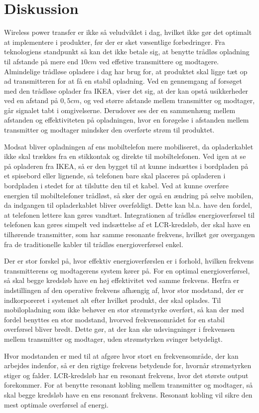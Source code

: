 \chapter{Diskussion}

Wireless power transfer er ikke så veludviklet i dag, hvilket ikke gør det optimalt at implementere i produkter, før der er sket væsentlige forbedringer. Fra teknologiens standpunkt så kan det ikke betale sig, at benytte trådløs opladning til afstande på mere end $10cm$ ved effetive transmittere og modtagere. Almindelige trådløse opladere i dag har brug for, at produktet skal ligge tæt op ad transmitteren for at få en stabil opladning. Ved en gennemgang af forsøget med den trådløse oplader fra IKEA, viser det sig, at der kan opstå usikkerheder ved en afstand på $0,5 cm$, og ved større afstande mellem transmitter og modtager, går signalet tabt i omgivelserne. Derudover ses der en sammenhæng mellem afstanden og effektiviteten på opladningen, hvor en forøgelse i afstanden mellem transmitter og modtager mindsker den overførte strøm til produktet.

Modsat bliver opladningen af ens mobiltelefon mere mobiliseret, da opladerkablet ikke skal trækkes fra en stikkontak og direkte til mobiltelefonen. Ved igen at se på opladeren fra IKEA, så er den bygget til at kunne indsættes i bordpladen på et spisebord eller lignende, så telefonen bare skal placeres på opladeren i bordpladen i stedet for at tilslutte den til et kabel. Ved at kunne overføre energien til mobiltelefoner trådløst, så sker der også en ændring på selve mobilen, da indgangen til opladerkablet bliver overføldigt. Dette kan bl.a. have den fordel, at telefonen lettere kan gøres vandtæt. Integrationen af trådløs energioverførsel til telefonen kan gøres simpelt ved indsættelse af et LCR-kredsløb, der skal have en tilhørende transmitter, som har samme resonante frekvens, hvilket gør overgangen fra de traditionelle kabler til trådløs energioverførsel enkel.

Der er stor forskel på, hvor effektiv energioverførslen er i forhold, hvilken frekvens transmitterens og modtagerens system kører på. For en optimal energioverførsel, så skal begge kredsløb have en høj effektivitet ved samme frekvens. Herfra er indstillingen af den operative frekvens afhængig af, hvor stor modstand, der er indkorporeret i systemet alt efter hvilket produkt, der skal oplades. Til mobilopladning som ikke behøver en stor strømstyrke overført, så kan der med fordel benyttes en stor modstand, hvorved frekvensområdet for en stabil overførsel bliver bredt. Dette gør, at der kan ske udsvingninger i frekvensen mellem transmitter og modtager, uden strømstyrken svinger betydeligt.

Hvor modstanden er med til at afgøre hvor stort en frekvensområde, der kan arbejdes indenfor, så er den rigtige frekvens betydende for, hvornår strømstyrken stiger og falder. LCR-kredsløb har en resonant frekvens, hvor det største output forekommer. For at benytte resonant kobling mellem transmitter og modtager, så skal begge kredsløb have en ens resonant frekvens. Resonant kobling vil sikre den mest optimale overførsel af energi.